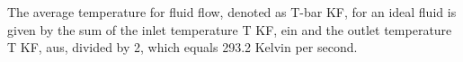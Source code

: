The average temperature for fluid flow, denoted as T-bar KF, for an ideal fluid is given by the sum of the inlet temperature T KF, ein and the outlet temperature T KF, aus, divided by 2, which equals 293.2 Kelvin per second.